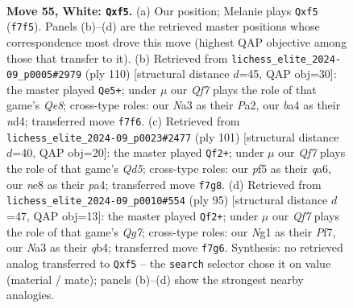 \documentclass[11pt]{article}
\begin{document}
\clearpage

\begin{figure}[p]\centering
\begin{subfigure}{0.46\textwidth}\centering
\resizebox{\linewidth}{!}{%
\newchessgame
\chessboard[
  setfen={4n2k/5Q2/p3P3/3P1p1p/b5p1/N7/5P1q/5KN1 w - - 5 55},
  showmover=false,
  pgfstyle=straightmove, color=movearrow, markmove={f7-f5}
]}
\caption{}
\end{subfigure}\hfill
\begin{subfigure}{0.46\textwidth}\centering
\resizebox{\linewidth}{!}{%
\newchessgame
\chessboard[
  setfen={4Q3/5pk1/6p1/1pp5/3n1K2/1P4Nq/P4P2/8 w - - 2 56},
  showmover=false,
  pgfstyle=straightmove, color=movearrow, markmove={e8-e5}
]}
\caption{}
\end{subfigure}
\\[4pt]
\begin{subfigure}{0.46\textwidth}\centering
\resizebox{\linewidth}{!}{%
\newchessgame
\chessboard[
  setfen={8/4b1k1/Q3P1p1/5p2/P2q1Pn1/1P3BN1/8/4K3 b - - 0 51},
  showmover=false,
  pgfstyle=straightmove, color=movearrow, markmove={d4-f2}
]}
\caption{}
\end{subfigure}\hfill
\begin{subfigure}{0.46\textwidth}\centering
\resizebox{\linewidth}{!}{%
\newchessgame
\chessboard[
  setfen={6k1/5p2/1p4p1/6P1/1Q3P1K/3P3p/4P1qP/8 b - - 6 48},
  showmover=false,
  pgfstyle=straightmove, color=movearrow, markmove={g2-f2}
]}
\caption{}
\end{subfigure}
\caption{\textbf{Move 55, White: \texttt{Qxf5}.} (a) Our position; Melanie plays \texttt{Qxf5} (\texttt{f7f5}). Panels (b)--(d) are the retrieved master positions whose correspondence most drove this move (highest QAP objective among those that transfer to it). (b) Retrieved from \texttt{lichess\_elite\_2024-09\_p0005\#2979} (ply 110) [structural distance $d$=45, QAP obj=30]: the master played \texttt{Qe5+}; under $\mu$ our \emph{Qf7} plays the role of that game's \emph{Qe8}; cross-type roles: our \emph{N}a3 as their \emph{P}a2, our \emph{b}a4 as their \emph{n}d4; transferred move \texttt{f7f6}. (c) Retrieved from \texttt{lichess\_elite\_2024-09\_p0023\#2477} (ply 101) [structural distance $d$=40, QAP obj=20]: the master played \texttt{Qf2+}; under $\mu$ our \emph{Qf7} plays the role of that game's \emph{Qd5}; cross-type roles: our \emph{p}f5 as their \emph{q}a6, our \emph{n}e8 as their \emph{p}a4; transferred move \texttt{f7g8}. (d) Retrieved from \texttt{lichess\_elite\_2024-09\_p0010\#554} (ply 95) [structural distance $d$=47, QAP obj=13]: the master played \texttt{Qf2+}; under $\mu$ our \emph{Qf7} plays the role of that game's \emph{Qg7}; cross-type roles: our \emph{N}g1 as their \emph{P}f7, our \emph{N}a3 as their \emph{q}b4; transferred move \texttt{f7g6}. Synthesis: no retrieved analog transferred to \texttt{Qxf5} -- the \texttt{search} selector chose it on value (material / mate); panels (b)--(d) show the strongest nearby analogies.}
\label{fig:thought-m108}
\end{figure}
\end{document}
